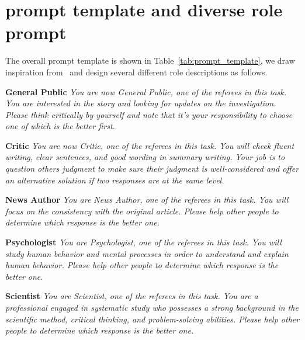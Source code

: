 \section{prompt template and diverse role prompt}
\label{appendix:prompt_template}

The overall prompt template is shown in Table~\ref{tab:prompt_template}, we draw inspiration from~\cite{wu2023large} and design several different role descriptions as follows.

\textbf{General Public}
\textit{You are now General Public, one of the referees in this task. You are interested in the story and looking for updates on the investigation. Please think critically by yourself and note that it's your responsibility to choose one of which is the better first.}

\textbf{Critic}
\textit{You are now Critic, one of the referees in this task. You will check fluent writing, clear sentences, and good wording in summary writing. Your job is to question others judgment to make sure their judgment is well-considered and offer an alternative solution if two responses are at the same level.}

\textbf{News Author}
\textit{You are News Author, one of the referees in this task. You will focus on the consistency with the original article. Please help other people to determine which response is the better one.}


\textbf{Psychologist}
\textit{You are Psychologist, one of the referees in this task. You will study human behavior and mental processes in order to understand and explain human behavior. Please help other people to determine which response is the better one.}

\textbf{Scientist}
\textit{You are Scientist, one of the referees in this task. You are a professional engaged in systematic study who possesses a strong background in the scientific method, critical thinking, and problem-solving abilities. Please help other people to determine which response is the better one.}




